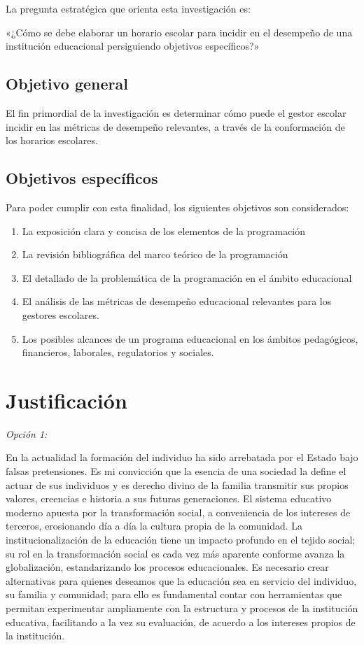 \documentclass[spanish,draft,12pt,headsepline,footsepline,paper=letter]{scrreprt}
\begin{document}
La pregunta estratégica que orienta esta investigación es: 

«¿Cómo se debe elaborar un horario escolar para incidir en el desempeño de una institución educacional persiguiendo objetivos específicos?»

\subsection*{Objetivo general}

El fin primordial de la investigación es determinar cómo puede el gestor escolar incidir en las métricas de desempeño relevantes, a través de la conformación de los horarios escolares.

\subsection*{Objetivos específicos}
Para poder cumplir con esta finalidad, los siguientes objetivos son considerados: \begin{enumerate}[1]
\setlength{\itemsep}{0cm}%
\setlength{\parskip}{0cm}%
\item La exposición clara y concisa de los elementos de la programación
\item La revisión bibliográfica del marco teórico de la programación
\item El detallado de la problemática de la programación en el ámbito educacional
\item El análisis de las métricas de desempeño educacional relevantes para los gestores escolares.
\item Los posibles alcances de un programa educacional en los ámbitos pedagógicos, financieros, laborales, regulatorios y sociales.
\end{enumerate}

\section*{Justificación}

\textit{Opción 1:}

En la actualidad la formación del individuo ha sido arrebatada por el Estado bajo falsas pretensiones. Es mi convicción que la esencia de una sociedad la define el actuar de sus individuos y es derecho divino de la familia transmitir sus propios valores, creencias e historia a sus futuras generaciones. El sistema educativo moderno apuesta por la transformación social, a conveniencia de los intereses de terceros, erosionando día a día la cultura propia de la comunidad. La institucionalización de la educación tiene un impacto profundo en el tejido social; su rol en la transformación social es cada vez más aparente conforme avanza la globalización, estandarizando los procesos educacionales. Es necesario crear alternativas para quienes deseamos que la educación sea en servicio del individuo, su familia y comunidad; para ello es fundamental contar con herramientas que permitan experimentar ampliamente con la estructura y procesos de la institución educativa, facilitando a la vez su evaluación, de acuerdo a los intereses propios de la institución. 
\end{document}
